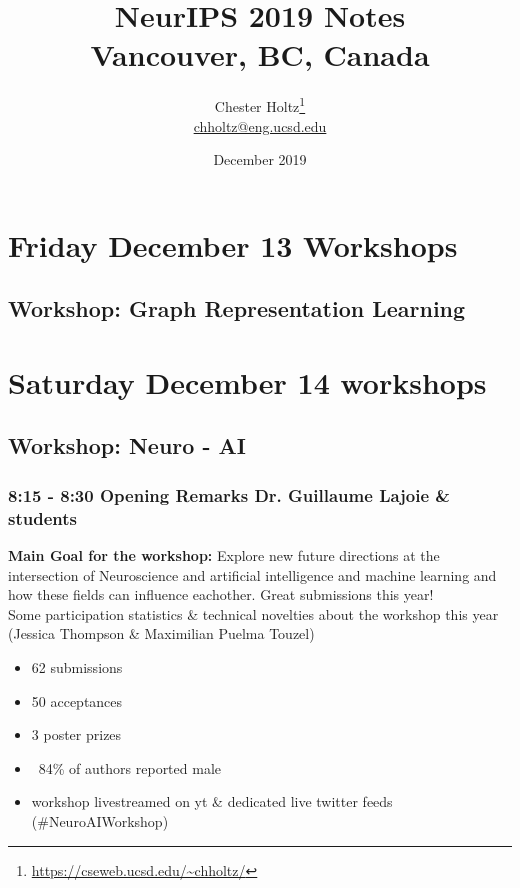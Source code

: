\documentclass[12pt]{article}
\title{NeurIPS 2019 Notes \\ \Large{Vancouver, BC, Canada}}
\author{Chester Holtz\footnote{\url{https://cseweb.ucsd.edu/\~chholtz/}} \\ \url{chholtz@eng.ucsd.edu}}
\date{December 2019}
\begin{document}
\maketitle


\section{Friday December 13 Workshops}

\subsection{Workshop: Graph Representation Learning}

\section{Saturday December 14 workshops}

\subsection{Workshop: Neuro - AI}

\subsubsection{8:15 - 8:30 Opening Remarks Dr. Guillaume Lajoie \& students}

\textbf{Main Goal for the workshop:} Explore new future directions at the intersection of Neuroscience and artificial intelligence and machine learning and how these fields can influence eachother. Great submissions this year! \\

Some participation statistics \& technical novelties about the workshop this year (Jessica Thompson \& Maximilian Puelma Touzel)
\begin{itemize}
\item 62 submissions
\item 50 acceptances
\item 3 poster prizes
\item ~84\% of authors reported male
\item workshop livestreamed on yt \& dedicated live twitter feeds (\#NeuroAIWorkshop)
\end{itemize}
\end{document}
